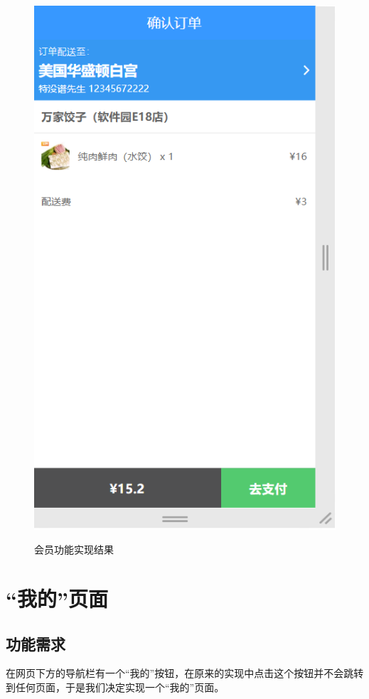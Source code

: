 \begin{figure}[H]
{\begin{minipage}[t]{0.48\linewidth}
            \centering
            \includegraphics[scale=0.5]{figures/5.1.2.png}\\
        \end{minipage}
    }
    \centering
    \caption{会员功能实现结果}
\end{figure}

\section{“我的”页面}
\subsection{功能需求}
在网页下方的导航栏有一个“我的”按钮，在原来的实现中点击这个按钮并不会跳转到任何页面，于是我们决定实现一个“我的”页面。~\\


